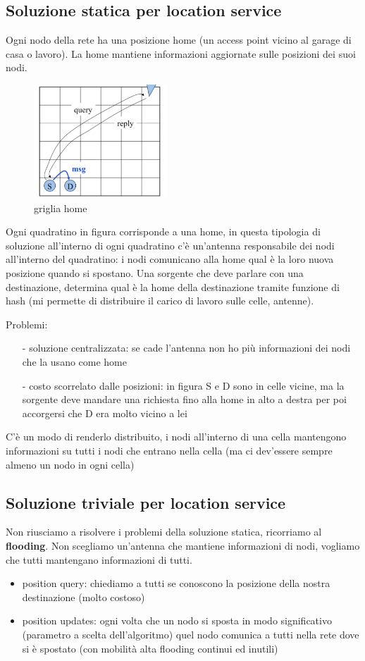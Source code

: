 \documentclass[12pt,italian]{report}
\begin{document}
\subsection{Soluzione statica per location service}
Ogni nodo della rete ha una posizione home (un access point vicino al garage di casa o lavoro). La home mantiene informazioni aggiornate sulle posizioni dei suoi nodi. 
\begin{figure}[h]
\centering
\includegraphics[width=50mm]{img/home.PNG}
\caption{griglia home}
\label{fig:home}
\end{figure}
\bigbreak
Ogni quadratino in figura corrisponde a una home, in questa tipologia di soluzione all'interno di ogni quadratino c'è un'antenna responsabile dei nodi all'interno del quadratino: i nodi comunicano alla home qual è la loro nuova posizione quando si spostano. Una sorgente che deve parlare con una destinazione, determina qual è la home della destinazione tramite funzione di hash (mi permette di distribuire il carico di lavoro sulle celle, antenne). 
\bigbreak

Problemi: 
\begin{itemize}
    \item [-] soluzione centralizzata: se cade l'antenna non ho più informazioni dei nodi che la usano come home
    \item [-] costo scorrelato dalle posizioni: in figura S e D sono in celle vicine, ma la sorgente deve mandare una richiesta fino alla home in alto a destra per poi accorgersi che D era molto vicino a lei
\end{itemize}
C'è un modo di renderlo distribuito, i nodi all'interno di una cella mantengono informazioni su tutti i nodi che entrano nella cella (ma ci dev'essere sempre almeno un nodo in ogni cella)

\subsection{Soluzione triviale per location service}
Non riusciamo a risolvere i problemi della soluzione statica, ricorriamo al \textbf{flooding}. Non scegliamo un'antenna che mantiene informazioni di nodi, vogliamo che tutti mantengano informazioni di tutti.
\begin{itemize}
    \item position query: chiediamo a tutti se conoscono la posizione della nostra destinazione (molto costoso)
    \item position updates: ogni volta che un nodo si sposta in modo significativo (parametro a scelta dell'algoritmo) quel nodo comunica a tutti nella rete dove si è spostato (con mobilità alta flooding continui ed inutili)
\end{itemize}
\end{document}
